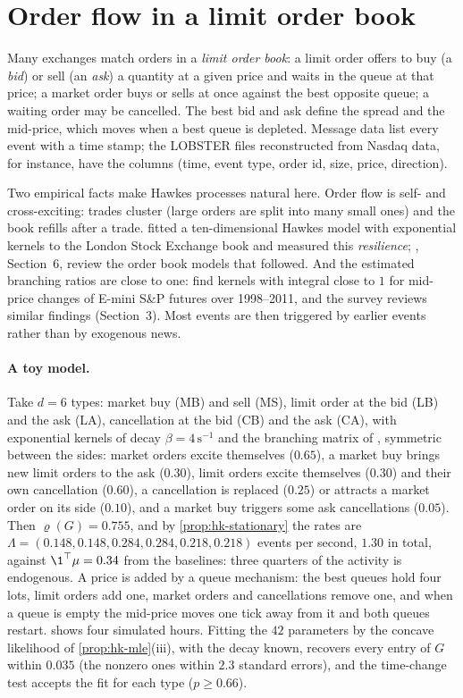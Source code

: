 \section{Order flow in a limit order book}\label{sec:hk-lob}

Many exchanges match orders in a \emph{limit order book}: a limit order offers to buy (a \emph{bid}) or sell (an
\emph{ask}) a quantity at a given price and waits in the queue at that price; a market order buys or sells at once
against the best opposite queue; a waiting order may be cancelled. The best bid and ask define the spread and the
mid-price, which moves when a best queue is depleted. Message data list every event with a time stamp; the LOBSTER
files reconstructed from Nasdaq data, for instance, have the columns (time, event type, order id, size, price,
direction).

Two empirical facts make Hawkes processes natural here. Order flow is self- and cross-exciting: trades cluster
(large orders are split into many small ones) and the book refills after a trade. \textcite{large-2007} fitted a
ten-dimensional Hawkes model with exponential kernels to the London Stock Exchange book and measured this
\emph{resilience}; \textcite{bacry-mastromatteo-muzy-2015}, Section~6, review the order book models that followed.
And the estimated branching ratios are close to one: \textcite{hardiman-bercot-bouchaud-2013} find kernels with
integral close to $1$ for mid-price changes of E-mini S\&P futures over 1998--2011, and the survey reviews similar
findings (Section~3). Most events are then triggered by earlier events rather than by exogenous news.

\paragraph{A toy model.} Take $d=6$ types: market buy (MB) and sell (MS), limit order at the bid (LB) and the ask
(LA), cancellation at the bid (CB) and the ask (CA), with exponential kernels of decay $\beta=4\,\mathrm s^{-1}$ and
the branching matrix of , symmetric between the sides: market orders excite
themselves ($0.65$), a market buy brings new limit orders to the ask ($0.30$), limit orders excite themselves
($0.30$) and their own cancellation ($0.60$), a cancellation is replaced ($0.25$) or attracts a market order on its
side ($0.10$), and a market buy triggers some ask cancellations ($0.05$). Then $\varrho(G)=0.755$, and by
\cref{prop:hk-stationary} the rates are $\Lambda=(0.148,0.148,0.284,0.284,0.218,0.218)$ events per second, $1.30$
in total, against $\1^\top\mu=0.34$ from the baselines: three quarters of the activity is endogenous. A price is
added by a queue mechanism: the best queues hold four lots, limit orders add one, market orders and cancellations
remove one, and when a queue is empty the mid-price moves one tick away from it and both queues restart.
 shows four simulated hours. Fitting the $42$ parameters by the concave likelihood of
\cref{prop:hk-mle}(iii), with the decay known, recovers every entry of $G$ within $0.035$ (the nonzero ones within $2.3$
standard errors), and the time-change test accepts the fit for each type ($p\ge0.66$).

